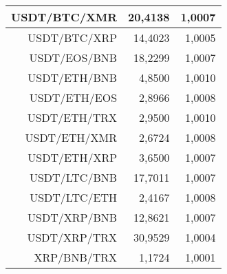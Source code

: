 \begin{table}
\begin{tabular}{|| r | r | r ||}
 \hline USDT/BTC/XMR & 20,4138 & 1,0007\\ 
 \hline USDT/BTC/XRP & 14,4023 & 1,0005\\ 
 \hline USDT/EOS/BNB & 18,2299 & 1,0007\\ 
 \hline USDT/ETH/BNB & 4,8500 & 1,0010\\ 
 \hline USDT/ETH/EOS & 2,8966 & 1,0008\\ 
 \hline USDT/ETH/TRX & 2,9500 & 1,0010\\ 
 \hline USDT/ETH/XMR & 2,6724 & 1,0008\\ 
 \hline USDT/ETH/XRP & 3,6500 & 1,0007\\ 
 \hline USDT/LTC/BNB & 17,7011 & 1,0007\\ 
 \hline USDT/LTC/ETH & 2,4167 & 1,0008\\ 
 \hline USDT/XRP/BNB & 12,8621 & 1,0007\\ 
 \hline USDT/XRP/TRX & 30,9529 & 1,0004\\ 
 \hline XRP/BNB/TRX & 1,1724 & 1,0001\\ 
 \hline
\end{tabular}
\end{table}